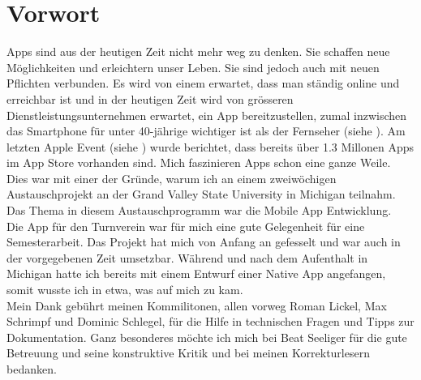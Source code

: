 \chapter*{Vorwort}\label{vorwort}
Apps sind aus der heutigen Zeit nicht mehr weg zu denken. Sie schaffen neue Möglichkeiten und erleichtern unser Leben. Sie sind jedoch auch mit neuen Pflichten verbunden. Es wird von einem erwartet, dass man ständig online und erreichbar ist und in der heutigen Zeit wird von grösseren Dienstleistungsunternehmen erwartet, ein App bereitzustellen, zumal inzwischen das Smartphone für unter 40-jährige wichtiger ist als der Fernseher (siehe \cite{digitalisierungsbericht2014}). Am letzten Apple Event (siehe \cite{apple_event_sept_2014}) wurde berichtet, dass bereits über 1.3 Millonen Apps im App Store vorhanden sind. Mich faszinieren Apps schon eine ganze Weile. Dies war mit einer der Gründe, warum ich an einem zweiwöchigen Austauschprojekt an der Grand Valley State University in Michigan teilnahm. Das Thema in diesem Austauschprogramm war die Mobile App Entwicklung.\\

Die App für den Turnverein war für mich eine gute Gelegenheit für eine Semesterarbeit. Das Projekt hat mich von Anfang an gefesselt und war auch in der vorgegebenen Zeit umsetzbar. Während und nach dem Aufenthalt in Michigan hatte ich bereits mit einem Entwurf einer Native App angefangen, somit wusste ich in etwa, was auf mich zu kam.\\

Mein Dank gebührt meinen Kommilitonen, allen vorweg Roman Lickel, Max Schrimpf und Dominic Schlegel, für die Hilfe in technischen Fragen und Tipps zur Dokumentation. Ganz besonderes möchte ich mich bei Beat Seeliger für die gute Betreuung und seine konstruktive Kritik und bei meinen Korrekturlesern bedanken.
